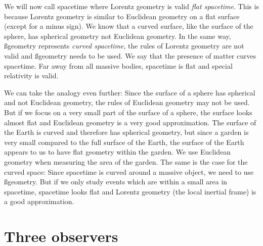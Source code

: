 {\begin{multicols}{2}
We will now call spacetime where Lorentz geometry is valid {\it flat spacetime}. This is because Lorentz geometry is similar to Euclidean geometry on a flat surface (except for a minus sign). We know that a curved surface, like the surface of the sphere, has spherical geometry not Euclidean geometry. In the same way, \ss geometry represents {\it curved spacetime}, the rules of Lorentz geometry are not valid and \ss geometry needs to be used. We say that the presence of matter curves spacetime. Far away from all massive bodies, spacetime is flat and special relativity is valid. 

We can take the analogy even further: Since the surface of a sphere has spherical and not Euclidean geometry, the rules of Euclidean geometry may not be used. But if we focus on a very small part of the surface of a sphere, the surface looks almost flat and Euclidean geometry is a very good approximation. The surface of the Earth is curved and therefore has spherical geometry, but since a garden is very small compared to the full surface of the Earth, the surface of the Earth appears to us to have flat geometry within the garden. We use Euclidean geometry when measuring the area of the garden. The same is the case for the curved space: Since spacetime is curved around a massive object, we need to use \ss geometry. But if we only study events which are within a small area in spacetime, spacetime looks flat and Lorentz geometry (the local inertial frame) is a good approximation.

\section{Three observers}
\label{sect:observers}


\end{multicols}}
